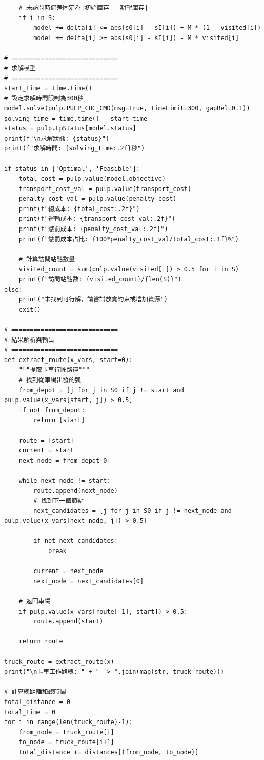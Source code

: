 \begin{verbatim}
    # 未訪問時偏差固定為|初始庫存 - 期望庫存|
    if i in S:
        model += delta[i] <= abs(s0[i] - sI[i]) + M * (1 - visited[i])
        model += delta[i] >= abs(s0[i] - sI[i]) - M * visited[i]

# =============================
# 求解模型
# =============================
start_time = time.time()
# 設定求解時間限制為300秒
model.solve(pulp.PULP_CBC_CMD(msg=True, timeLimit=300, gapRel=0.1))
solving_time = time.time() - start_time
status = pulp.LpStatus[model.status]
print(f"\n求解狀態: {status}")
print(f"求解時間: {solving_time:.2f}秒")

if status in ['Optimal', 'Feasible']:
    total_cost = pulp.value(model.objective)
    transport_cost_val = pulp.value(transport_cost)
    penalty_cost_val = pulp.value(penalty_cost)
    print(f"總成本: {total_cost:.2f}")
    print(f"運輸成本: {transport_cost_val:.2f}")
    print(f"懲罰成本: {penalty_cost_val:.2f}")
    print(f"懲罰成本占比: {100*penalty_cost_val/total_cost:.1f}%")
    
    # 計算訪問站點數量
    visited_count = sum(pulp.value(visited[i]) > 0.5 for i in S)
    print(f"訪問站點數: {visited_count}/{len(S)}")
else:
    print("未找到可行解，請嘗試放寬約束或增加資源")
    exit()

# =============================
# 結果解析與輸出
# =============================
def extract_route(x_vars, start=0):
    """提取卡車行駛路徑"""
    # 找到從車場出發的弧
    from_depot = [j for j in S0 if j != start and pulp.value(x_vars[start, j]) > 0.5]
    if not from_depot:
        return [start]
    
    route = [start]
    current = start
    next_node = from_depot[0]
    
    while next_node != start:
        route.append(next_node)
        # 找到下一個節點
        next_candidates = [j for j in S0 if j != next_node and pulp.value(x_vars[next_node, j]) > 0.5]
        
        if not next_candidates:
            break
            
        current = next_node
        next_node = next_candidates[0]
    
    # 返回車場
    if pulp.value(x_vars[route[-1], start]) > 0.5:
        route.append(start)
    
    return route

truck_route = extract_route(x)
print("\n卡車工作路線: " + " -> ".join(map(str, truck_route)))

# 計算總距離和總時間
total_distance = 0
total_time = 0
for i in range(len(truck_route)-1):
    from_node = truck_route[i]
    to_node = truck_route[i+1]
    total_distance += distances[(from_node, to_node)]
    

\end{verbatim}
